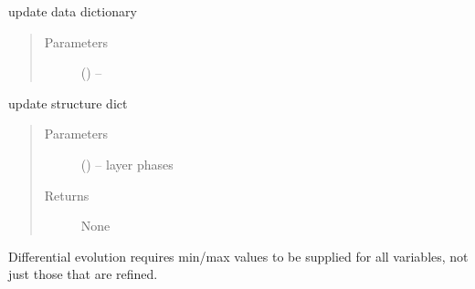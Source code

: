 \documentclass[letterpaper,10pt,english]{sphinxmanual}
\begin{document}
\begin{fulllineitems}
\begin{fulllineitems}
\begin{quote}
\begin{description}
\end{description}\end{quote}

\end{fulllineitems}


\begin{fulllineitems}
\label{\detokenize{rst/pairdistributionfunction:mstack.pairdistributionfunction.PdfRefinement.update_data}}
update data dictionary
\begin{quote}\begin{description}
\item[{Parameters}] \leavevmode
{} () -- 

\end{description}\end{quote}

\end{fulllineitems}


\begin{fulllineitems}
\label{\detokenize{rst/pairdistributionfunction:mstack.pairdistributionfunction.PdfRefinement.update_phases}}
update structure dict
\begin{quote}\begin{description}
\item[{Parameters}] \leavevmode
{} () -- layer phases

\item[{Returns}] \leavevmode
None

\end{description}\end{quote}

\end{fulllineitems}


\begin{fulllineitems}
\label{\detokenize{rst/pairdistributionfunction:mstack.pairdistributionfunction.PdfRefinement.validate_diffev}}
Differential evolution requires min/max values to be supplied for all
variables, not just those that are refined.


\end{fulllineitems}
\end{fulllineitems}
\end{document}
